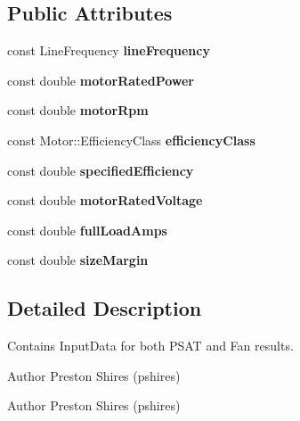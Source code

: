 \subsection*{Public Attributes}
\begin{DoxyCompactItemize}
\item 
\mbox{\label{struct_motor_a51e3b0191b70b167348f6d1fcf33dffa}} 
const Line\+Frequency {\bfseries line\+Frequency}
\item 
\mbox{\label{struct_motor_ac488edfbd918e91b2cf5581bae6a3d42}} 
const double {\bfseries motor\+Rated\+Power}
\item 
\mbox{\label{struct_motor_aa437c0e2db53bbc948794afb1081b059}} 
const double {\bfseries motor\+Rpm}
\item 
\mbox{\label{struct_motor_a69eb3624f866ac1b27865ca494414c1c}} 
const Motor\+::\+Efficiency\+Class {\bfseries efficiency\+Class}
\item 
\mbox{\label{struct_motor_a1b202cba6ed0b1f13c5fe1b768148d5d}} 
const double {\bfseries specified\+Efficiency}
\item 
\mbox{\label{struct_motor_a7b7e315f3de114d48fce9d87606540f1}} 
const double {\bfseries motor\+Rated\+Voltage}
\item 
\mbox{\label{struct_motor_a7e11d5569d1ec3b3ecb2dfa6d5f19727}} 
const double {\bfseries full\+Load\+Amps}
\item 
\mbox{\label{struct_motor_a5d05eed62ab3c38056d72a706836d214}} 
const double {\bfseries size\+Margin}
\end{DoxyCompactItemize}


\subsection{Detailed Description}
Contains Input\+Data for both P\+S\+AT and Fan results. 

\begin{DoxyAuthor}{Author}
Preston Shires (pshires) 
\end{DoxyAuthor}


\begin{DoxyAuthor}{Author}
Preston Shires (pshires) 
\end{DoxyAuthor}


